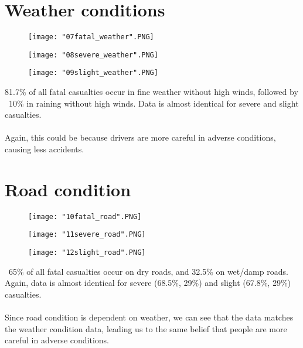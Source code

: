 \documentclass[a4paper, 12pt]{article}
\begin{document}
\section{Weather conditions}
\begin{figure}[!h]
\texttt{[image: "07fatal\_weather".PNG]}
\end{figure}
\begin{figure}[!h]
\texttt{[image: "08severe\_weather".PNG]}
\end{figure}
\begin{figure}[!h]
\texttt{[image: "09slight\_weather".PNG]}
\end{figure}
81.7\% of all fatal casualties occur in fine weather without high winds, followed by ~10\% in raining without high winds. Data is almost identical for severe and slight casualties.
\paragraph{} Again, this could be because drivers are more careful in adverse conditions, causing less accidents.
\section{Road condition}
\begin{figure}[!h]
\texttt{[image: "10fatal\_road".PNG]}
\end{figure}
\begin{figure}[!h]
\texttt{[image: "11severe\_road".PNG]}
\end{figure}
\begin{figure}[!h]
\texttt{[image: "12slight\_road".PNG]}
\end{figure}
~65\% of all fatal casualties occur on dry roads, and 32.5\% on wet/damp roads. Again, data is almost identical for severe (68.5\%, 29\%) and slight (67.8\%, 29\%) casualties.
\paragraph{} Since road condition is dependent on weather, we can see that the data matches the weather condition data, leading us to the same belief that people are more careful in adverse conditions.
\vfill
\clearpage
\end{document}
